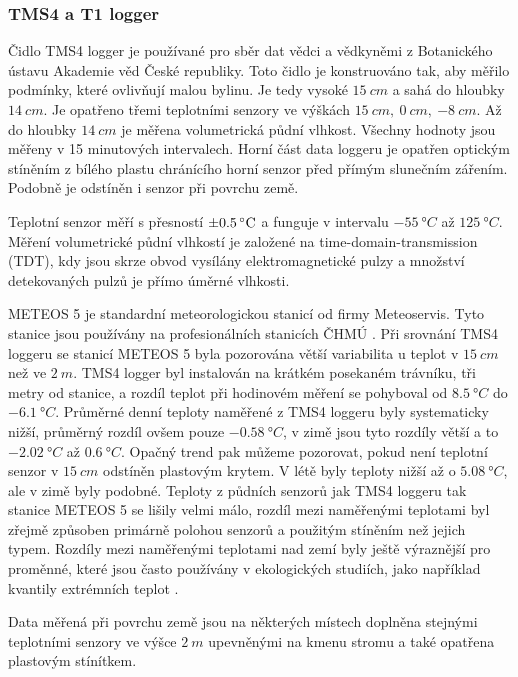 \subsubsection{TMS4 a T1 logger} \label{chap:loggers}
Čidlo TMS4 logger je používané pro sběr dat vědci a vědkyněmi z Botanického ústavu Akademie věd České republiky. Toto čidlo je konstruováno tak, aby měřilo podmínky, které ovlivňují malou bylinu. Je tedy vysoké $\SI{15}{cm}$ a sahá do hloubky $\SI{14}{cm}$. Je opatřeno třemi teplotními senzory ve výškách $\SI{15}{cm},\ \SI{0}{cm},\ \SI{-8}{cm}$. Až do hloubky $\SI{14}{cm}$ je měřena volumetrická půdní vlhkost. Všechny hodnoty jsou měřeny v 15 minutových intervalech. Horní část data loggeru je opatřen optickým stíněním z bílého plastu chránícího horní senzor před přímým slunečním zářením. Podobně je odstíněn i senzor při povrchu země. 

Teplotní senzor měří s přesností $\SI{\pm 0.5}{\degree C}$ a funguje v intervalu $\SI{-55}{\degree C}$ až $\SI{125}{\degree C}$. Měření volumetrické půdní vlhkostí je založené na time-domain-transmission (TDT), kdy jsou skrze obvod vysílány elektromagnetické pulzy a množství detekovaných pulzů je přímo úměrné vlhkosti. 

METEOS 5 je standardní meteorologickou stanicí od firmy Meteoservis. Tyto stanice jsou používány na profesionálních stanicích ČHMÚ \parencite{meteos5}. Při srovnání TMS4 loggeru se stanicí METEOS 5 byla pozorována větší variabilita u teplot v $\SI{15}{cm}$ než ve $\SI{2}{m}$. TMS4 logger byl instalován na krátkém posekaném trávníku, tři metry od stanice, a rozdíl teplot při hodinovém měření se pohyboval od $\SI{+8.5}{\degree C}$ do $\SI{-6.1}{\degree C}$. Průměrné denní teploty naměřené z TMS4 loggeru byly systematicky nižší, průměrný rozdíl ovšem pouze $\SI{-0.58}{\degree C}$, v zimě jsou tyto rozdíly větší a to $\SI{-2.02}{\degree C}$ až $\SI{0.6}{\degree C}$. Opačný trend pak můžeme pozorovat, pokud není teplotní senzor v $\SI{15}{cm}$ odstíněn plastovým krytem. V létě byly teploty nižší až o $\SI{5.08}{\degree C}$, ale v zimě byly podobné. Teploty z půdních senzorů jak TMS4 loggeru tak stanice METEOS 5 se lišily velmi málo, rozdíl mezi naměřenými teplotami byl zřejmě způsoben primárně polohou senzorů a použitým stíněním než jejich typem. Rozdíly mezi naměřenými teplotami nad zemí byly ještě výraznější pro proměnné, které jsou často používány v ekologických studiích, jako například kvantily extrémních teplot \parencite{WildJan2019Caer}. 

Data měřená při povrchu země jsou na některých místech doplněna stejnými teplotními senzory ve výšce $\SI{2}{m}$ upevněnými na kmenu stromu a také opatřena plastovým stínítkem.

